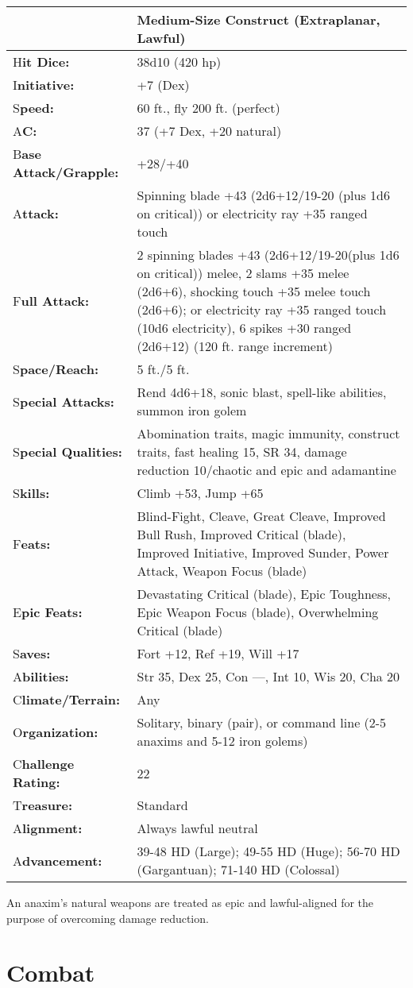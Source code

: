 \documentclass{article}
\begin{document}
\begin{tabular}{|>{\raggedright}p{65pt}|>{\raggedright}p{260pt}|}
\hline
 & Medium-Size Construct (Extraplanar, Lawful) \tabularnewline
\hline
H\textbf{it Dice:} & 38d10 (420 hp) \tabularnewline
\hline
I\textbf{nitiative:} & +7 (Dex) \tabularnewline
\hline
S\textbf{peed:} & 60 ft., fly 200 ft. (perfect) \tabularnewline
\hline
A\textbf{C:} & 37 (+7 Dex, +20 natural) \tabularnewline
\hline
B\textbf{ase Attack/Grapple:} & +28/+40\tabularnewline
\hline
A\textbf{ttack:} & Spinning blade +43 (2d6+12/19-20 (plus 1d6 on critical)) or 
electricity ray +35 ranged touch\tabularnewline
\hline
F\textbf{ull Attack:} & 2 spinning blades +43 (2d6+12/19-20(plus 1d6 on critical)) 
melee, 2 slams +35 melee (2d6+6), shocking touch +35 melee touch (2d6+6); or electricity 
ray +35 ranged touch (10d6 electricity), 6 spikes +30 ranged (2d6+12) (120 ft. 
range increment)\tabularnewline
\hline
S\textbf{pace/Reach:} & 5 ft./5 ft. \tabularnewline
\hline
S\textbf{pecial Attacks:} & Rend 4d6+18, sonic blast, spell-like abilities, summon 
iron golem \tabularnewline
\hline
S\textbf{pecial Qualities:} & Abomination traits, magic immunity, construct traits, 
fast healing 15, SR 34, damage reduction 10/chaotic and epic and adamantine\tabularnewline
\hline
S\textbf{kills:} & Climb +53, Jump +65\tabularnewline
\hline
F\textbf{eats:} & Blind-Fight, Cleave, Great Cleave, Improved Bull Rush, Improved 
Critical (blade), Improved Initiative, Improved Sunder, Power Attack, Weapon Focus 
(blade)\tabularnewline
\hline
E\textbf{pic Feats:} & Devastating Critical (blade), Epic Toughness, Epic Weapon 
Focus (blade), Overwhelming Critical (blade)\tabularnewline
\hline
S\textbf{aves:} & Fort +12, Ref +19, Will +17 \tabularnewline
\hline
A\textbf{bilities:} & Str 35, Dex 25, Con ---, Int 10, Wis 20, Cha 20 \tabularnewline
\hline
C\textbf{limate/Terrain:} & Any \tabularnewline
\hline
O\textbf{rganization:} & Solitary, binary (pair), or command line (2-5 anaxims 
and 5-12 iron golems) \tabularnewline
\hline
C\textbf{hallenge Rating:} & 22 \tabularnewline
\hline
T\textbf{reasure:} & Standard \tabularnewline
\hline
A\textbf{lignment:} & Always lawful neutral \tabularnewline
\hline
A\textbf{dvancement:} & 39-48 HD (Large); 49-55 HD (Huge); 56-70 HD (Gargantuan); 
71-140 HD (Colossal)\tabularnewline
\hline
\end{tabular}

An anaxim's natural weapons are treated as epic and lawful-aligned for the purpose 
of overcoming damage reduction.

\section*{Combat\textbf{ }}
\end{document}
